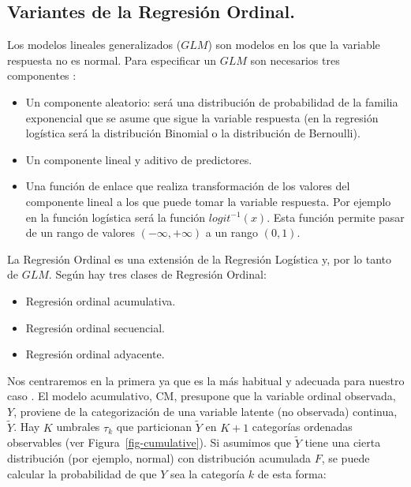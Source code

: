 \documentclass[
  12pt,
  a4paper,
  extrafontsizes,
  onecolumn,
  openright]{memoir}
\providecommand{\tightlist}{%
  \setlength{\itemsep}{0pt}\setlength{\parskip}{0pt}}\usepackage{longtable,booktabs,array}
\begin{document}
\hypertarget{variantes-de-la-regresiuxf3n-ordinal.}{%
\subsection{Variantes de la Regresión
Ordinal.}\label{variantes-de-la-regresiuxf3n-ordinal.}}

Los modelos lineales generalizados (\(GLM\)) son modelos en los que la
variable respuesta no es normal. Para especificar un \(GLM\) son
necesarios tres componentes \autocite[ver][]{oconnell2006}:

\begin{itemize}
\tightlist
\item
  Un componente aleatorio: será una distribución de probabilidad de la
  familia exponencial que se asume que sigue la variable respuesta (en
  la regresión logística será la distribución Binomial o la distribución
  de Bernoulli).
\item
  Un componente lineal y aditivo de predictores.
\item
  Una función de enlace que realiza transformación de los valores del
  componente lineal a los que puede tomar la variable respuesta. Por
  ejemplo en la función logística será la función \(logit^{-1}(x)\).
  Esta función permite pasar de un rango de valores
  \((-\infty, +\infty)\) a un rango \((0, 1)\).
\end{itemize}

La Regresión Ordinal es una extensión de la Regresión Logística y, por
lo tanto de \(GLM\). Según \textcite{burkner2019} hay tres clases de
Regresión Ordinal:

\begin{itemize}
\tightlist
\item
  Regresión ordinal acumulativa.
\item
  Regresión ordinal secuencial.
\item
  Regresión ordinal adyacente.
\end{itemize}

Nos centraremos en la primera ya que es la más habitual y adecuada para
nuestro caso \autocite[ver][pp.~23-24]{burkner2019}. El modelo
acumulativo, CM, presupone que la variable ordinal observada, \(Y\),
proviene de la categorización de una variable latente (no observada)
continua, \(\tilde{Y}\). Hay \(K\) umbrales \(\tau_k\) que particionan
\(\tilde{Y}\) en \(K + 1\) categorías ordenadas observables (ver
Figura~\ref{fig-cumulative}). Si asumimos que \(\tilde{Y}\) tiene una
cierta distribución (por ejemplo, normal) con distribución acumulada
\(F\), se puede calcular la probabilidad de que \(Y\) sea la categoría
\(k\) de esta forma:
\end{document}
